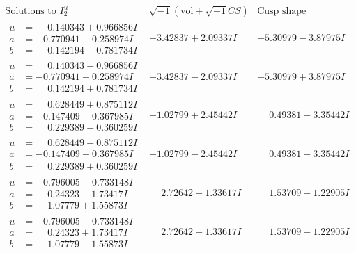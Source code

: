 \documentclass[1p]{elsarticle_modified}
\theoremstyle{definition}
\newcommand{\I}{\sqrt{-1}}
\begin{document}
$$\begin{array}{c|c|c}  
\text{Solutions to }I^u_{2}& \I (\text{vol} + \sqrt{-1}CS) & \text{Cusp shape}\\
 \hline 
\begin{aligned}
u &= \phantom{-}0.140343 + 0.966856 I \\
a &= -0.770941 - 0.258974 I \\
b &= \phantom{-}0.142194 - 0.781734 I\end{aligned}
 & -3.42837 + 2.09337 I & -5.30979 - 3.87975 I \\ \hline\begin{aligned}
u &= \phantom{-}0.140343 - 0.966856 I \\
a &= -0.770941 + 0.258974 I \\
b &= \phantom{-}0.142194 + 0.781734 I\end{aligned}
 & -3.42837 - 2.09337 I & -5.30979 + 3.87975 I \\ \hline\begin{aligned}
u &= \phantom{-}0.628449 + 0.875112 I \\
a &= -0.147409 - 0.367985 I \\
b &= \phantom{-}0.229389 - 0.360259 I\end{aligned}
 & -1.02799 + 2.45442 I & \phantom{-}0.49381 - 3.35442 I \\ \hline\begin{aligned}
u &= \phantom{-}0.628449 - 0.875112 I \\
a &= -0.147409 + 0.367985 I \\
b &= \phantom{-}0.229389 + 0.360259 I\end{aligned}
 & -1.02799 - 2.45442 I & \phantom{-}0.49381 + 3.35442 I \\ \hline\begin{aligned}
u &= -0.796005 + 0.733148 I \\
a &= \phantom{-}0.24323 - 1.73417 I \\
b &= \phantom{-}1.07779 + 1.55873 I\end{aligned}
 & \phantom{-}2.72642 + 1.33617 I & \phantom{-}1.53709 - 1.22905 I \\ \hline\begin{aligned}
u &= -0.796005 - 0.733148 I \\
a &= \phantom{-}0.24323 + 1.73417 I \\
b &= \phantom{-}1.07779 - 1.55873 I\end{aligned}
 & \phantom{-}2.72642 - 1.33617 I & \phantom{-}1.53709 + 1.22905 I \\ \hline\begin{aligned}

\end{aligned}
\end{array}$$
\end{document}
